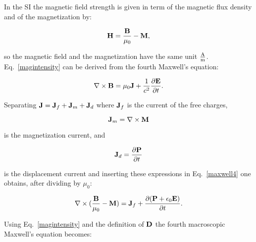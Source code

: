 \documentclass[12pt,a4paper,twoside]{report}
\begin{document}
{In the SI the magnetic field strength is given in term of the
magnetic flux density and of the magnetization by:

\begin{tcolorbox}
\begin{equation}
{\bf H}={{\bf B} \over \mu_0} - {\bf M},
\label{magintensity}
\end{equation}
\end{tcolorbox}

so the magnetic field and the magnetization have the same
unit ${{\rm A} \over {\rm m}}$.\\
Eq.~\ref{magintensity} can be derived from the fourth Maxwell's equation:

\begin{tcolorbox}
\begin{equation}
\nabla \times {\bf B}= \mu_0 {\bf J} + {1\over c^2} {\partial {\bf E} \over
\partial t}.
\label{maxwell4}
\end{equation}
\end{tcolorbox}

Separating ${\bf J}={\bf J}_f + {\bf J}_m + {\bf J}_d$ where
${\bf J}_f$ is the current of the free charges, 

\begin{tcolorbox}
\begin{equation}
{\bf J}_m=\nabla \times {\bf M}
\end{equation}
\end{tcolorbox}

is the magnetization current, and

\begin{tcolorbox}
\begin{equation}
{\bf J}_d={\partial {\bf P} \over \partial t}
\end{equation}
\end{tcolorbox}

is the displacement current and inserting these expressions in 
Eq.~\ref{maxwell4} one obtains, after dividing by $\mu_0$:

\begin{tcolorbox}
\begin{equation}
\nabla \times ({{\bf B}\over \mu_0}-{\bf M})= {\bf J}_f + 
{\partial ({\bf P} + \epsilon_0 {\bf E} )\over
\partial t}.
\end{equation}
\end{tcolorbox}

Using Eq.~\ref{magintensity} and the definition of ${\bf D}$ the
fourth macroscopic Maxwell's equation becomes:

}
\end{document}
